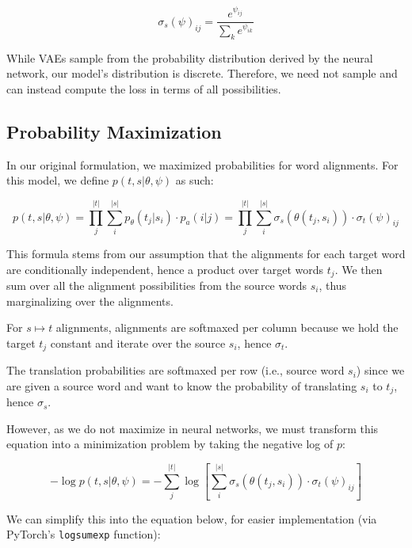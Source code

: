 \documentclass[twoside,twocolumn]{article}
\newlength\mystoreparindent
\newenvironment{myparindent}[1]{%
  \setlength{\mystoreparindent}{\the\parindent}
  \setlength{\parindent}{#1}
  }{%
  \setlength{\parindent}{\mystoreparindent}
}
\begin{document}
\begin{myparindent}{0pt}
\begin{equation}
  \sigma_s(\psi)_{ij} = \frac{e^{\psi_{ij}}}{\sum_{k} e^{\psi_{ik}}}
\end{equation}

While VAEs sample from the probability distribution derived by the neural
network, our model's distribution is discrete. Therefore, we need not
sample and can instead compute the loss in terms of all possibilities.

\subsection{Probability Maximization}

In our original formulation, we
maximized probabilities for word alignments.
For this model, we define $p(t, s | \theta, \psi)$ as such:

\begin{equation}
  p(t, s | \theta, \psi)
    = \prod_j^{|t|} \sum_i^{|s|} p_\theta(t_j| s_i) \cdot p_a(i|j)
    = \prod_j^{|t|} \sum_i^{|s|} \sigma_s(\theta(t_j, s_i)) \cdot \sigma_t(\psi)_{ij}
\end{equation}

This formula stems from our assumption that the alignments for each
target word are conditionally independent, hence a product over target
words $t_j$. We then sum over all the alignment possibilities from the source
words $s_i$, thus marginalizing over the alignments.

For $s \mapsto t$ alignments, alignments are softmaxed per column because we hold the target $t_j$ constant and iterate over the source $s_i$, hence $\sigma_t$.

The translation probabilities are softmaxed per row (i.e., source word $s_i$) since we are given a source word
and want to know the probability of translating $s_i$ to $t_j$, hence $\sigma_s$.

However, as we do not maximize in neural networks, we must transform this
equation into a minimization problem by taking the negative log of $p$:

\begin{equation}
  -\log p(t, s | \theta, \psi) =
  - \sum_j^{|t|}
     \log \left[ \sum_i^{|s|} \sigma_s \left( \theta(t_j, s_i) \right) \cdot
      \sigma_t(\psi)_{ij} \right]
\end{equation}

We can simplify this into the equation below, for easier implementation
(via PyTorch's \texttt{logsumexp} function):


\end{myparindent}
\end{document}
